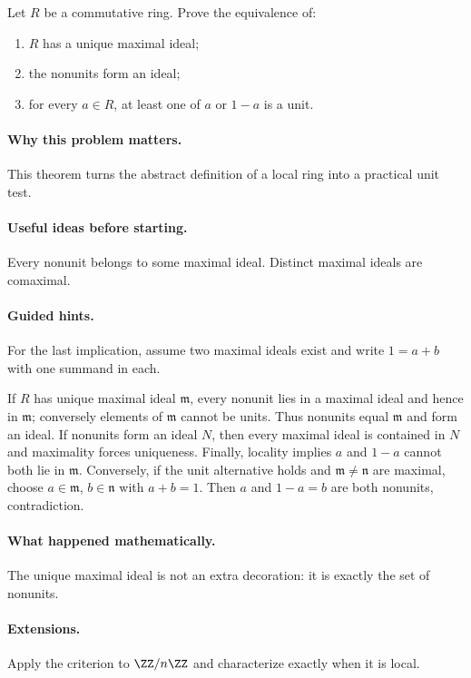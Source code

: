 \begin{problem}
Let $R$ be a commutative ring.  Prove the equivalence of:
\begin{enumerate}
\item $R$ has a unique maximal ideal;
\item the nonunits form an ideal;
\item for every $a\in R$, at least one of $a$ or $1-a$ is a unit.
\end{enumerate}
\end{problem}

\paragraph{Why this problem matters.}
This theorem turns the abstract definition of a local ring into a practical unit test.

\paragraph{Useful ideas before starting.}
Every nonunit belongs to some maximal ideal.  Distinct maximal ideals are comaximal.

\paragraph{Guided hints.}
For the last implication, assume two maximal ideals exist and write $1=a+b$ with one summand in each.

\begin{solution}
If $R$ has unique maximal ideal $\mathfrak m$, every nonunit lies in a maximal ideal and hence in $\mathfrak m$; conversely elements of $\mathfrak m$ cannot be units.  Thus nonunits equal $\mathfrak m$ and form an ideal.  If nonunits form an ideal $N$, then every maximal ideal is contained in $N$ and maximality forces uniqueness.  Finally, locality implies $a$ and $1-a$ cannot both lie in $\mathfrak m$.  Conversely, if the unit alternative holds and $\mathfrak m\ne\mathfrak n$ are maximal, choose $a\in\mathfrak m$, $b\in\mathfrak n$ with $a+b=1$.  Then $a$ and $1-a=b$ are both nonunits, contradiction.
\end{solution}

\paragraph{What happened mathematically.}
The unique maximal ideal is not an extra decoration: it is exactly the set of nonunits.

\paragraph{Extensions.}
Apply the criterion to $\ZZ/n\ZZ$ and characterize exactly when it is local.
